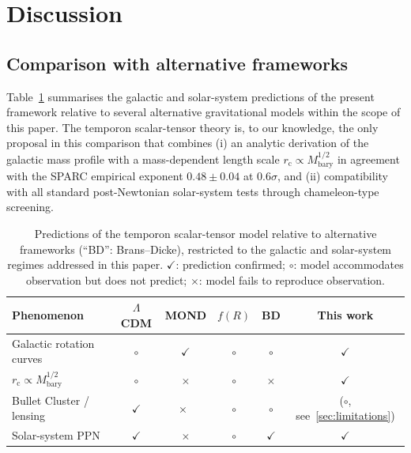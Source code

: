 \documentclass[%
    aps,
    prd,
    reprint,
    superscriptaddress,
    nofootinbib,
    floatfix,
    amsmath,amssymb,
]{revtex4-2}
\newcommand{\Mbary}{M_{\mathrm{bary}}}
\newcommand{\rc}{r_{\mathrm{c}}}
\begin{document}
\section{Discussion}
\label{sec:disc}

\subsection{Comparison with alternative frameworks}

Table~\ref{tab:comparison} summarises the galactic and
solar-system predictions of the present framework relative to
several alternative gravitational models within the scope of this
paper. The temporon scalar-tensor theory is, to our knowledge,
the only proposal in this comparison that combines (i) an
analytic derivation of the galactic mass profile with a
mass-dependent length scale $\rc\propto\Mbary^{1/2}$ in agreement
with the SPARC empirical exponent $0.48\pm 0.04$ at $0.6\sigma$,
and (ii) compatibility with all standard post-Newtonian
solar-system tests through chameleon-type screening.

\begin{table}[t]
\caption{\label{tab:comparison} Predictions of the temporon
scalar-tensor model relative to alternative frameworks
(``BD'': Brans--Dicke), restricted to the galactic and solar-system
regimes addressed in this paper.
$\checkmark$: prediction confirmed;
$\circ$: model accommodates observation but does not predict;
$\times$: model fails to reproduce observation.}
\footnotesize
\begin{ruledtabular}
\begin{tabular}{lccccc}
Phenomenon & $\Lambda$CDM & MOND & $f(R)$ & BD & This work \\
\hline
Galactic rotation curves            & $\circ$      & $\checkmark$ & $\circ$ & $\circ$ & $\checkmark$ \\
$\rc\!\propto\!\Mbary^{1/2}$        & $\circ$      & $\times$     & $\circ$ & $\times$ & $\checkmark$ \\
Bullet Cluster / lensing            & $\checkmark$ & $\times$~\cite{Clowe2006} & $\circ$ & $\circ$ & ($\circ$, see~\ref{sec:limitations}) \\
Solar-system PPN                    & $\checkmark$ & $\times$     & $\circ$ & $\checkmark$ & $\checkmark$ \\
\end{tabular}
\end{ruledtabular}
\end{table}
\end{document}
